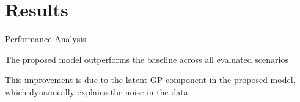 \section{Results}

\begin{frame}{Performance Analysis}
	
\begin{block}{}
	The proposed model outperforms the baseline across all evaluated scenarios
\end{block}	
 
\begin{figure}[htbp]
	\centering
	
\end{figure}

\begin{block}{}
	This improvement is due to the latent GP component in the proposed model, which dynamically explains the noise in the data.
\end{block}

\end{frame}


